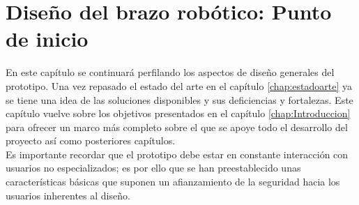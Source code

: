 \chapter{Diseño del brazo robótico: Punto de inicio} \label{chap:Punto_partida}

En este capítulo se continuará perfilando los aspectos de diseño generales del prototipo. Una vez repasado el estado del arte en el capítulo \ref{chap:estadoarte} ya se tiene una idea de las soluciones disponibles y sus deficiencias y fortalezas. Este capítulo vuelve sobre los objetivos presentados en el capítulo \ref{chap:Introduccion} para ofrecer un marco más completo sobre el que se apoye todo el desarrollo del proyecto así como posteriores capítulos.
\\

Es importante recordar que el prototipo debe estar en constante interacción con usuarios no especializados; es por ello que se han preestablecido unas características básicas que suponen un afianzamiento de la seguridad hacia los usuarios inherentes al diseño.

